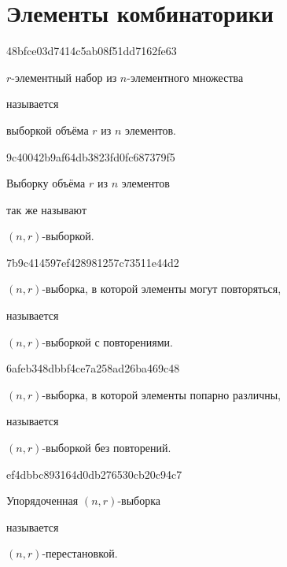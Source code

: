 \section{Элементы комбинаторики}
\begin{note}{48bfce03d7414c5ab08f51dd7162fe63}
    \begin{icloze}{2}\({ r }\)-элементный набор из \({ n }\)-элементного множества\end{icloze} называется \begin{icloze}{1}выборкой объёма \({ r }\) из \({ n }\) элементов.\end{icloze}
\end{note}

\begin{note}{9c40042b9af64db3823fd0fc687379f5}
    \begin{icloze}{2}Выборку объёма \({ r }\) из \({ n }\) элементов\end{icloze} так же называют \begin{icloze}{1}\({ (n, r) }\)-выборкой.\end{icloze}
\end{note}

\begin{note}{7b9c414597ef428981257c73511e44d2}
    \begin{icloze}{2}\({ (n, r) }\)-выборка, в которой элементы могут повторяться,\end{icloze} называется \begin{icloze}{1}\({ (n, r) }\)-выборкой с повторениями.\end{icloze}
\end{note}

\begin{note}{6afeb348dbbf4ce7a258ad26ba469c48}
    \begin{icloze}{2}\({ (n, r) }\)-выборка, в которой элементы попарно различны,\end{icloze} называется \begin{icloze}{1}\({ (n, r) }\)-выборкой без повторений.\end{icloze}
\end{note}

\begin{note}{ef4dbbc893164d0db276530cb20c94c7}
    \begin{icloze}{2}Упорядоченная \({ (n, r) }\)-выборка\end{icloze} называется \begin{icloze}{1}\({ (n, r) }\)-пе\-ре\-ста\-нов\-кой.\end{icloze}
\end{note}

